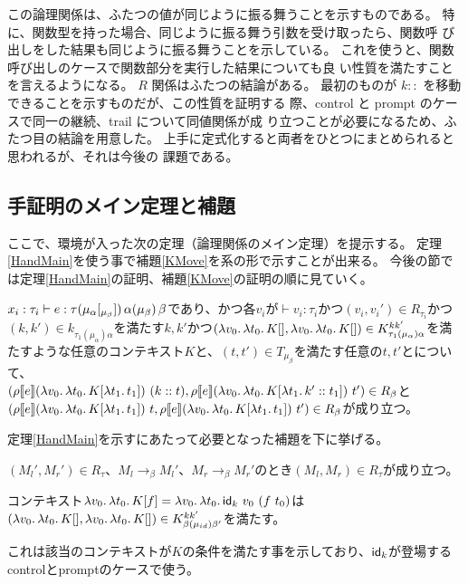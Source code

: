 この論理関係は、ふたつの値が同じように振る舞うことを示すものである。
特に、関数型を持った場合、同じように振る舞う引数を受け取ったら、関数呼
び出しをした結果も同じように振る舞うことを示している。
これを使うと、関数呼び出しのケースで関数部分を実行した結果についても良
い性質を満たすことを言えるようになる。
$R$ 関係はふたつの結論がある。
最初のものが $k::$ を移動できることを示すものだが、この性質を証明する
際、control と prompt のケースで同一の継続、trail について同値関係が成
り立つことが必要になるため、ふたつ目の結論を用意した。
上手に定式化すると両者をひとつにまとめられると思われるが、それは今後の
課題である。

\subsection{手証明のメイン定理と補題}
ここで、環境が入った次の定理（論理関係のメイン定理）を提示する。
定理\ref{HandMain}を使う事で補題\ref{KMove}を系の形で示すことが出来る。
今後の節では定理\ref{HandMain}の証明、補題\ref{KMove}の証明の順に見ていく。
\begin{theorem}
  $x_i:\tau_i \vdash e:\tau (\mu_{\alpha}\lbrack \tiny{_{\mu_{\beta}}} \rbrack)\,\alpha (\mu_{\beta})\,\beta$であり、かつ各$v_i$が$\vdash v_i:\tau_i$かつ$(v_i,v_i') \in R_{\tau_i}$かつ$(k,k')\in k_{\tau_1(\mu_{\alpha})\alpha}$を満たす$k,k'$かつ$(\lambda{v_0}.\,{\lambda{t_0}.\,{K[]}}, \lambda{v_0}.\,{\lambda{t_0}.\,{K[]}})\in  K^{kk'}_{\tau_1(\mu_{\alpha})\alpha}$を満たすような任意のコンテキスト$K$と、$(t, t') \in T_{\mu_{\beta}}$を満たす任意の$t, t'$とについて、\\
  $(\rho [\![{e}]\!] (\lambda{v_0}.\,{\lambda{t_0}.\,{K[\lambda{t_1}.\,{t_1}]}})\ (k::t), \rho [\![{e}]\!] (\lambda{v_0}.\,{\lambda{t_0}.\,{K[\lambda{t_1}.\,{k'::t_1}]}})\ t')\in R_{\beta}$と\\
  $(\rho [\![{e}]\!] (\lambda{v_0}.\,{\lambda{t_0}.\,{K[\lambda{t_1}.\,{t_1}]}})\ t, \rho [\![{e}]\!] (\lambda{v_0}.\,{\lambda{t_0}.\,{K[\lambda{t_1}.\,{t_1}]}})\ t')\in R_{\beta}$が成り立つ。
\label{HandMain}
\end{theorem}
定理\ref{HandMain}を示すにあたって必要となった補題を下に挙げる。
\begin{lemma}[簡約と論理関係の保存]
  $(M_l', M_r') \in R_{\tau}、M_l \rightarrow_{\beta} M_l'、M_r \rightarrow_{\beta} M_r'$のとき$(M_l, M_r) \in R_{\tau}$が成り立つ。
\label{Reduction2}
\end{lemma}
\begin{lemma}
  コンテキスト$\Lam{v_0}{\Lam{t_0}{K[f]}}=\Lam{v_0}{\Lam{t_0}{\Idk\ v_0\ (f\ t_0)}}$は\\
  $(\lambda{v_0}.\,{\lambda{t_0}.\,{K[]}}, \lambda{v_0}.\,{\lambda{t_0}.\,{K[]}})\in  K^{kk'}_{\beta(\mu_{id})\beta'}$を満たす。
\label{IdkContext}
\end{lemma}
これは該当のコンテキストが$K$の条件を満たす事を示しており、$\textsf{id}_k$が登場するcontrolとpromptのケースで使う。

